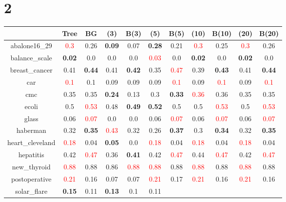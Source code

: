 \documentclass{article}%
\begin{document}
\section*{2}%
\begin{tabular}{c|cccccccccc}%
\hline%
&Tree&BG&(3)&B(3)&(5)&B(5)&(10)&B(10)&(20)&B(20)\\%
\hline%
abalone16\_29&\textcolor{red}{ 
0.3
}&0.26&\textbf{0.09}&0.07&\textbf{0.28}&0.21&\textcolor{red}{ 
0.3
}&0.25&\textcolor{red}{ 
0.3
}&0.26\\%
\hline%
balance\_scale&\textbf{0.02}&0.0&0.0&0.0&\textcolor{red}{ 
0.03
}&0.0&\textbf{0.02}&0.0&\textbf{0.02}&0.0\\%
\hline%
breast\_cancer&0.41&\textbf{0.44}&0.41&\textbf{0.42}&0.35&\textcolor{red}{ 
0.47
}&0.39&\textbf{0.43}&0.41&\textbf{0.44}\\%
\hline%
car&\textcolor{red}{ 
0.1
}&0.1&0.09&0.09&0.09&\textcolor{red}{ 
0.1
}&0.09&\textcolor{red}{ 
0.1
}&0.09&\textcolor{red}{ 
0.1
}\\%
\hline%
cmc&0.35&0.35&\textbf{0.24}&0.13&0.3&\textbf{0.33}&\textcolor{red}{ 
0.36
}&0.36&0.35&0.35\\%
\hline%
ecoli&0.5&\textcolor{red}{ 
0.53
}&0.48&\textbf{0.49}&\textbf{0.52}&0.5&0.5&\textcolor{red}{ 
0.53
}&0.5&\textcolor{red}{ 
0.53
}\\%
\hline%
glass&0.06&\textcolor{red}{ 
0.07
}&0.0&0.0&0.06&\textcolor{red}{ 
0.07
}&0.06&\textcolor{red}{ 
0.07
}&0.06&\textcolor{red}{ 
0.07
}\\%
\hline%
haberman&0.32&\textbf{0.35}&\textcolor{red}{ 
0.43
}&0.32&0.26&\textbf{0.37}&0.3&\textbf{0.34}&0.32&\textbf{0.35}\\%
\hline%
heart\_cleveland&\textcolor{red}{ 
0.18
}&0.04&\textbf{0.05}&0.0&\textcolor{red}{ 
0.18
}&0.04&\textcolor{red}{ 
0.18
}&0.04&\textcolor{red}{ 
0.18
}&0.04\\%
\hline%
hepatitis&0.42&\textcolor{red}{ 
0.47
}&0.36&\textbf{0.41}&0.42&\textcolor{red}{ 
0.47
}&0.44&\textcolor{red}{ 
0.47
}&0.42&\textcolor{red}{ 
0.47
}\\%
\hline%
new\_thyroid&\textcolor{red}{ 
0.88
}&0.88&0.86&\textcolor{red}{ 
0.88
}&\textcolor{red}{ 
0.88
}&0.88&\textcolor{red}{ 
0.88
}&0.88&\textcolor{red}{ 
0.88
}&0.88\\%
\hline%
postoperative&\textcolor{red}{ 
0.21
}&0.16&0.07&0.07&\textcolor{red}{ 
0.21
}&0.17&\textcolor{red}{ 
0.21
}&0.16&\textcolor{red}{ 
0.21
}&0.16\\%
\hline%
solar\_flare&\textbf{0.15}&0.11&\textbf{0.13}&0.1&0.11&\textcolor{red}{ 
}
\end{tabular}
\end{document}
